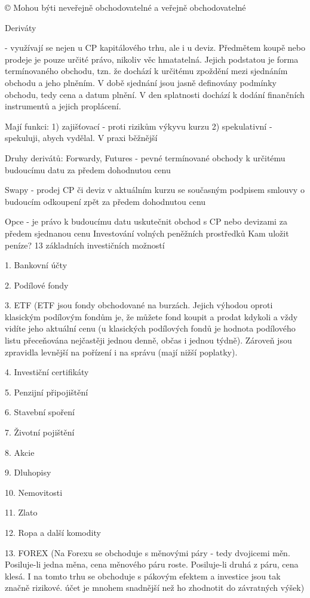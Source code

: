 © Mohou býti neveřejně obchodovatelné a veřejně obchodovatelné

Deriváty

- využívají se nejen u CP kapitálového trhu, ale i u deviz. Předmětem koupě nebo prodeje je pouze určité právo, nikoliv
věc hmatatelná. Jejich podstatou je forma termínovaného obchodu, tzn. že dochází k určitému zpoždění mezi
sjednáním obchodu a jeho plněním. V době sjednání jsou jasně definovány podmínky obchodu, tedy cena a datum
plnění. V den splatnosti dochází k dodání finančních instrumentů a jejich proplácení.

Mají funkci: 1) zajišťovací - proti rizikům výkyvu kurzu
2) spekulativní - spekuluji, abych vydělal. V praxi běžnější

Druhy derivátů:
Forwardy, Futures - pevné termínované obchody k určitému budoucímu datu za předem dohodnutou cenu

Swapy - prodej CP či deviz v aktuálním kurzu se současným podpisem smlouvy o budoucím odkoupení zpět za předem
dohodnutou cenu

Opce - je právo k budoucímu datu uskutečnit obchod s CP nebo devizami za předem sjednanou cenu
\newpage
Investování volných peněžních prostředků
Kam uložit peníze? 13 základních investičních možností

1. Bankovní účty

2. Podílové fondy

3. ETF (ETF jsou fondy obchodované na burzách. Jejich výhodou oproti klasickým podílovým fondům je, že můžete fond koupit a
prodat kdykoli a vždy vidíte jeho aktuální cenu (u klasických podílových fondů je hodnota podílového listu přeceňována nejčastěji
jednou denně, občas i jednou týdně). Zároveň jsou zpravidla levnější na pořízení i na správu (mají nižší poplatky).

4. Investiční certifikáty

5. Penzijní připojištění

6. Stavební spoření

7. Životní pojištění

8. Akcie

9. Dluhopisy

10. Nemovitosti

11. Zlato

12. Ropa a další komodity

13. FOREX (Na Forexu se obchoduje s měnovými páry - tedy dvojicemi měn. Posiluje-li jedna měna, cena měnového páru roste.
Posiluje-li druhá z páru, cena klesá. I na tomto trhu se obchoduje s pákovým efektem a investice jsou tak značně rizikové. 
účet je mnohem snadnější než ho zhodnotit do závratných výšek)

